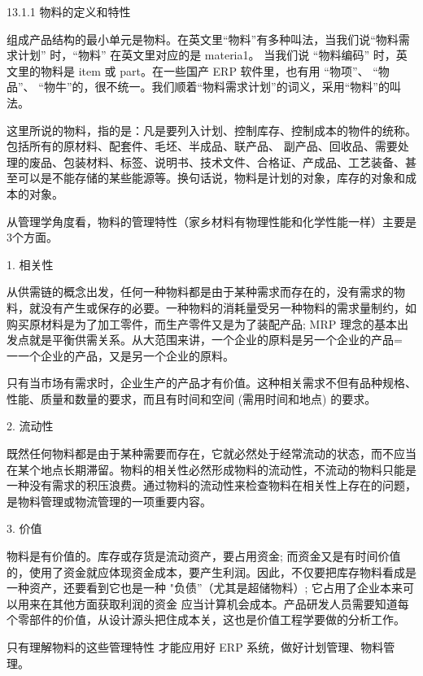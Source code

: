 13.1.1 物料的定义和特性

    组成产品结构的最小单元是物料。在英文里“物料”有多种叫法，当我们说“物料需求计划” 时，“物料” 在英文里对应的是 materia1。 当我们说 “物料编码” 时，英文里的物料是 item 或 part。在一些国产 ERP 软件里，也有用 “物项”、 “物品”、 “物牛”的，很不统一。我们顺着“物料需求计划”的词义，采用“物料”的叫法。

    这里所说的物料，指的是：凡是要列入计划、控制库存、控制成本的物件的统称。包括所有的原材料、配套件、毛坯、半成品、联产品、 副产品、回收品、需要处理的废品、包装材料、标签、说明书、技术文件、合格证、产成品、工艺装备、甚至可以是不能存储的某些能源等。换句话说，物料是计划的对象，库存的对象和成本的对象。

    从管理学角度看，物料的管理特性（家乡材料有物理性能和化学性能一样）主要是3个方面。

1. 相关性

    从供需链的概念出发，任何一种物料都是由于某种需求而存在的，没有需求的物料，就没有产生或保存的必要。一种物料的消耗量受另一种物料的需求量制约，如购买原材料是为了加工零件，而生产零件又是为了装配产品; MRP 理念的基本出发点就是平衡供需关系。从大范围来讲，一个企业的原料是另一个企业的产品= 一一个企业的产品，又是另一个企业的原料。

    只有当市场有需求时，企业生产的产品才有价值。这种相关需求不但有品种规格、性能、质量和数量的要求，而且有时间和空间 (需用时间和地点) 的要求。

2. 流动性

    既然任何物料都是由于某种需要而存在，它就必然处于经常流动的状态，而不应当在某个地点长期滞留。物料的相关性必然形成物料的流动性，不流动的物料只能是一种没有需求的积压浪费。通过物料的流动性来检查物料在相关性上存在的问题，是物料管理或物流管理的一项重要内容。

3. 价值

    物料是有价值的。库存或存货是流动资产，要占用资金; 而资金又是有时间价值的，使用了资金就应体现资金成本，要产生利润。因此，不仅要把库存物料看成是一种资产，还要看到它也是一种 "负债”（尤其是超储物料）; 它占用了企业本来可以用来在其他方面获取利润的资金 应当计算机会成本。产品研发人员需要知道每个零部件的价值，从设计源头把住成本关，这也是价值工程学要做的分析工作。

    只有理解物料的这些管理特性 才能应用好 ERP 系统，做好计划管理、物料管理。
